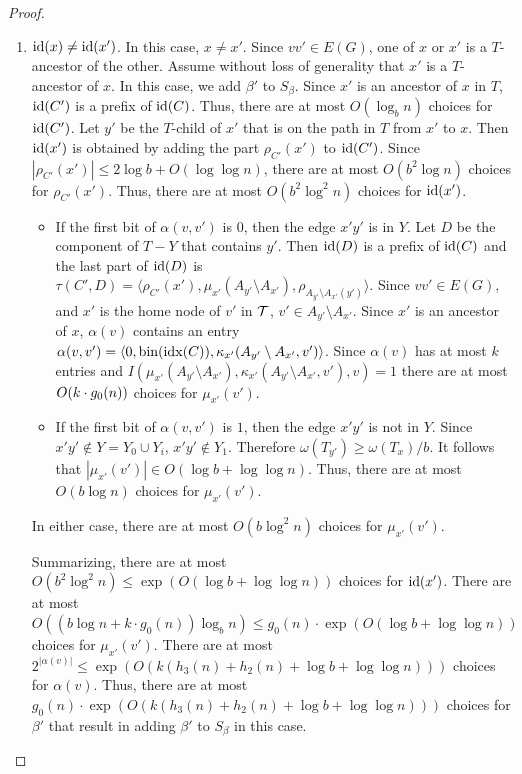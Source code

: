\begin{proof}
\begin{enumerate}
    \item $\operatorname{id}(x)\neq\operatorname{id}(x')$.  In this case, $x\neq x'$.  Since $vv'\in E(G)$, one of $x$ or $x'$ is a $T$-ancestor of the other.  Assume without loss of generality that $x'$ is a $T$-ancestor of $x$.  In this case, we add $\beta'$ to $S_\beta$.  Since $x'$ is an ancestor of $x$ in $T$, $\operatorname{id}(C')$ is a prefix of $\operatorname{id}(C)$.  Thus, there are at most $O(\log_b n)$ choices for $\operatorname{id}(C')$.  Let $y'$ be the $T$-child of $x'$ that is on the path in $T$ from $x'$ to $x$.  Then $\operatorname{id}(x')$ is obtained by adding the part $\rho_{C'}(x')$ to $\operatorname{id}(C')$.   Since $|\rho_{C'}(x')|\le 2\log b + O(\log\log n)$, there are at most $O(b^2\log n)$ choices for $\rho_{C'}(x')$.  Thus, there are at most $O(b^2\log^2 n)$ choices for $\operatorname{id}(x')$.  
    \begin{itemize}
      \item If the first bit of $\alpha(v,v')$ is $0$, then the edge $x'y'$ is in $Y$.  Let $D$ be the component of $T-Y$ that contains $y'$.  Then $\operatorname{id}(D)$ is a prefix of $\operatorname{id}(C)$ and the last part of $\operatorname{id}(D)$ is $\tau(C',D)=\langle \rho_{C'}(x'),\mu_{x'}(A_{y'}\setminus A_{x'}),\rho_{A_{y'}\setminus A_{x'}(y')}\rangle$.  Since $vv'\in E(G)$, and $x'$ is the home node of $v'$ in $\mathcal{T}$, $v'\in A_{y'}\setminus A_{x'}$.  Since $x'$ is an ancestor of $x$, $\alpha(v)$ contains an entry $\alpha(v,v')=\langle 0,\operatorname{bin}(\operatorname{idx}(C)), \kappa_{x'}(A_{y'}\setminus A_{x'},v')\rangle$.  Since $\alpha(v)$ has at most $k$ entries and $I(\mu_{x'}(A_{y'}\setminus A_{x'}),\kappa_{x'}(A_{y'}\setminus A_{x'},v'), v)=1$ there are at most $O(k\cdot g_0(n))$ choices for $\mu_{x'}(v')$. 

      \item If the first bit of $\alpha(v,v')$ is $1$, then the edge $x'y'$ is not in $Y$.  Since $x'y'\not\in Y=Y_0\cup Y_i$, $x'y'\not\in Y_1$.  Therefore $\omega(T_{y'})\ge \omega(T_x)/b$.  It follows that $|\mu_{x'}(v')|\in O(\log b + \log\log n)$.  Thus, there are at most $O(b\log n)$ choices for $\mu_{x'}(v')$.  
    \end{itemize}
    In either case, there are at most $O(b\log^2 n)$ choices for $\mu_{x'}(v')$. 
    
    Summarizing, there are at most $O(b^2\log^2 n)\le\exp(O(\log b+\log\log n))$ choices for $\operatorname{id}(x')$.  There are at most $O((b\log n+k\cdot g_0(n))\log_b n)\le g_0(n)\cdot\exp(O(\log b+\log\log n))$ choices for $\mu_{x'}(v')$.  There are at most $2^{|\alpha(v)|}\le \exp(O(k(h_3(n)+h_2(n)+\log b+\log\log n)))$ choices for $\alpha(v)$.  Thus, there are at most $g_0(n)\cdot \exp(O(k(h_3(n)+h_2(n)+\log b+\log\log n)))$ choices for $\beta'$ that result in adding $\beta'$ to $S_\beta$ in this case.
  \end{enumerate}
\end{proof}  


